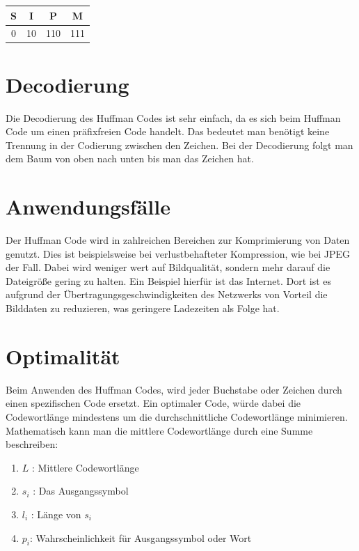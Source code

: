 \documentclass{article}
\begin{document}
\begin {tabular}{c c c c}
    S & I & P & M\\
    \hline
    0 & 10 & 110 & 111
\end{tabular}

\section{Decodierung}

Die Decodierung des Huffman Codes ist sehr einfach, da es sich beim Huffman Code um einen präfixfreien Code handelt. Das bedeutet man benötigt keine Trennung in der Codierung zwischen den Zeichen. Bei der Decodierung folgt man dem Baum von oben nach unten bis man das Zeichen hat.

\section{Anwendungsfälle}\cite{noauthor_jpeg-kompression_nodate}

Der Huffman Code wird in zahlreichen Bereichen zur Komprimierung von Daten genutzt.
Dies ist beispielsweise bei verlustbehafteter Kompression, wie bei JPEG der Fall. Dabei wird weniger wert auf Bildqualität, sondern mehr darauf die Dateigrö{\ss}e gering zu halten.
Ein Beispiel hierfür ist das Internet. Dort ist es aufgrund der Übertragungsgeschwindigkeiten des Netzwerks von Vorteil die Bilddaten zu reduzieren, was geringere Ladezeiten als Folge hat.

\section{Optimalität}\cite{noauthor_huffman-kodierung_2019}

Beim Anwenden des Huffman Codes, wird jeder Buchstabe oder Zeichen durch einen spezifischen Code ersetzt.
Ein optimaler Code, würde dabei die Codewortlänge mindestens um die durchschnittliche Codewortlänge minimieren.
Mathematisch kann man die mittlere Codewortlänge durch eine Summe beschreiben:

\begin{enumerate}
    \item $L$ : Mittlere Codewortlänge
    \item $s_i$ : Das Ausgangssymbol
    \item $l_i$ : Länge von $s_i$
    \item $p_i$: Wahrscheinlichkeit für Ausgangssymbol oder Wort
\end{enumerate}
\end{document}
